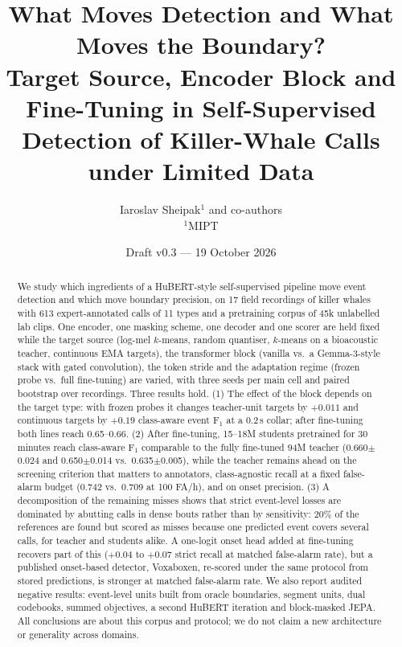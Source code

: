 \documentclass[10pt,twocolumn]{article}
\title{What Moves Detection and What Moves the Boundary?\\Target Source, Encoder Block and Fine-Tuning in Self-Supervised\\Detection of Killer-Whale Calls under Limited Data}
\author{Iaroslav Sheipak$^{1}$ and co-authors \\[2pt] \small $^1$MIPT}
\date{Draft v0.3 --- 19 October 2026}
\newcommand{\Fone}{F$_1$}
\begin{document}
\maketitle

\begin{abstract}
We study which ingredients of a HuBERT-style self-supervised pipeline move event detection and which move boundary precision, on 17 field recordings of killer whales with 613 expert-annotated calls of 11 types and a pretraining corpus of 45k unlabelled lab clips. One encoder, one masking scheme, one decoder and one scorer are held fixed while the target source (log-mel $k$-means, random quantiser, $k$-means on a bioacoustic teacher, continuous EMA targets), the transformer block (vanilla vs.\ a Gemma-3-style stack with gated convolution), the token stride and the adaptation regime (frozen probe vs.\ full fine-tuning) are varied, with three seeds per main cell and paired bootstrap over recordings. Three results hold. (1) The effect of the block depends on the target type: with frozen probes it changes teacher-unit targets by $+0.011$ and continuous targets by $+0.19$ class-aware event \Fone{} at a 0.2\,s collar; after fine-tuning both lines reach 0.65--0.66. (2) After fine-tuning, 15--18M students pretrained for 30 minutes reach class-aware \Fone{} comparable to the fully fine-tuned 94M teacher (0.660$\pm$0.024 and 0.650$\pm$0.014 vs.\ 0.635$\pm$0.005), while the teacher remains ahead on the screening criterion that matters to annotators, class-agnostic recall at a fixed false-alarm budget (0.742 vs.\ 0.709 at 100 FA/h), and on onset precision. (3) A decomposition of the remaining misses shows that strict event-level losses are dominated by abutting calls in dense bouts rather than by sensitivity: 20\% of the references are found but scored as misses because one predicted event covers several calls, for teacher and students alike. A one-logit onset head added at fine-tuning recovers part of this ($+0.04$ to $+0.07$ strict recall at matched false-alarm rate), but a published onset-based detector, Voxaboxen, re-scored under the same protocol from stored predictions, is stronger at matched false-alarm rate. We also report audited negative results: event-level units built from oracle boundaries, segment units, dual codebooks, summed objectives, a second HuBERT iteration and block-masked JEPA. All conclusions are about this corpus and protocol; we do not claim a new architecture or generality across domains.
\end{abstract}
\end{document}
